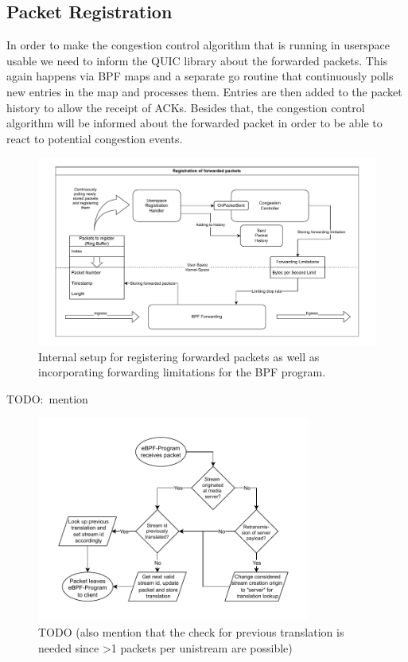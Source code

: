 \subsection{Packet Registration}
In order to make the congestion control algorithm that is running in userspace
usable we need to inform the QUIC library about the forwarded packets.
This again happens via BPF maps and a separate go routine that continuously
polls new entries in the map and processes them.
Entries are then added to the packet history to allow the receipt of ACKs.
Besides that, the congestion control algorithm will be informed about the
forwarded packet in order to be able to react to potential congestion events.
\begin{figure}[htbp]
    \centering
    \includegraphics[width=\textwidth]{figures/03_fast_relays/forward-registration.drawio.pdf}
    \caption{Internal setup for registering forwarded packets as well as incorporating forwarding
    limitations for the BPF program.}\label{fig:forward-registration}
\end{figure}



TODO:~mention
\begin{figure}[htbp]
    \centering
    \includegraphics[width=0.8\textwidth]{figures/03_fast_relays/stream-id-translation.drawio.pdf}
    \caption{TODO (also mention that the check for previous translation is needed since >1 packets per unistream are possible)}\label{fig:stream-id-translation}
\end{figure}